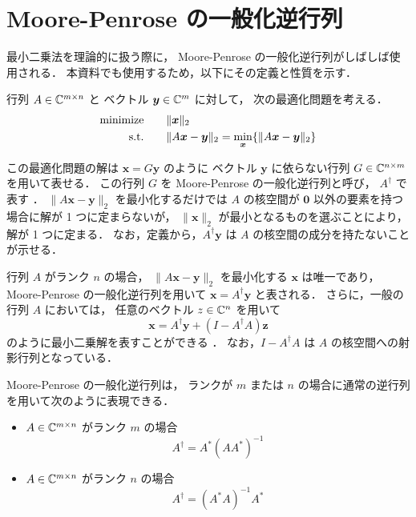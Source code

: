 %

\section{Moore-Penrose の一般化逆行列}

最小二乗法を理論的に扱う際に，
Moore-Penrose の一般化逆行列がしばしば使用される．
本資料でも使用するため，以下にその定義と性質を示す．

行列 $A \in \mathbb{C}^{m \times n}$ と
ベクトル $\bm{y} \in \mathbb{C}^m$ に対して，
次の最適化問題を考える．
\begin{align}
    \text{minimize} \hspace{2em} & \|\bm{x}\|_2
    \notag                                                                                          \\
    \text{s.t.} \hspace{2em}     & \|A\bm{x}-\bm{y}\|_2 =  \min_{\bm{x}} \{ \|A\bm{x}-\bm{y}\|_2 \}
    \notag
\end{align}

この最適化問題の解は $\bm{x}=G\bm{y}$ のように
ベクトル $\bm{y}$ に依らない行列
$G \in \mathbb{C}^{n \times m}$ を用いて表せる．
この行列 $G$ を Moore-Penrose の一般化逆行列と呼び，
$A^\dagger$ で表す \cite[定義3]{Rao1971}．
$\|A \bm{x} - \bm{y}\|_2$ を最小化するだけでは
$A$ の核空間が $\bm{0}$ 以外の要素を持つ場合に解が 1 つに定まらないが，
$\|\bm{x}\|_2$ が最小となるものを選ぶことにより，
解が 1 つに定まる．
なお，定義から，$A^\dagger \bm{y}$ は $A$ の核空間の成分を持たないことが示せる．

行列 $A$ がランク $n$ の場合，
$\|A \bm{x} - \bm{y}\|_2$ を最小化する $\bm{x}$ は唯一であり，
Moore-Penrose の一般化逆行列を用いて
$\bm{x} = A^\dagger \bm{y}$ と表される．
さらに，一般の行列 $A$ においては，
任意のベクトル $z \in \mathbb{C}^n$ を用いて
\begin{equation}
    \bm{x} = A^\dagger \bm{y} + (I - A^\dagger A) \bm{z}
    \label{eq:matrix-computation_moore-penrose_general-least-squares-solution}
\end{equation}
のように最小二乗解を表すことができる \cite[定理2.3.1]{Rao1971}．
なお，$I - A^\dagger A$ は $A$ の核空間への射影行列となっている．

Moore-Penrose の一般化逆行列は，
ランクが $m$ または $n$ の場合に通常の逆行列を用いて次のように表現できる．

\begin{itemize}
    \item $A \in \mathbb{C}^{m \times n}$ がランク $m$ の場合
          \begin{equation}
              A^\dagger = A^* (A A^*)^{-1}
          \end{equation}
    \item $A \in \mathbb{C}^{m \times n}$ がランク $n$ の場合
          \begin{equation}
              A^\dagger = (A^* A)^{-1} A^*
          \end{equation}
\end{itemize}

